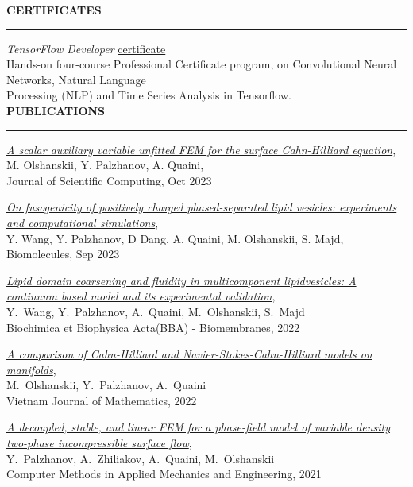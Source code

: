 \documentclass[10pt,letterpaper]{letter}
\newcommand{\gsect}[1]{\textcolor{codepurple}{\textbf{{\Large \uppercase{#1} }}} \\ \hrule}
\begin{document}
\gsect{Certificates}
\textsl{TensorFlow Developer} \href{https://coursera.org/share/f65948fc03c3da5785b670010c27bbe4}{\textsf{certificate}}\\
\hspace*{10mm}  Hands-on four-course Professional Certificate program, on Convolutional Neural Networks, Natural Language \\ \hspace*{10mm} Processing (NLP) and Time Series Analysis in Tensorflow.\\



\newpage
\gsect{Publications}
\begin{etaremune}
	\item \textsl{\href{https://doi.org/10.1007/s10915-023-02370-8}{A scalar auxiliary variable unfitted FEM for the surface Cahn-Hilliard equation}},\\ M. Olshanskii, Y. Palzhanov, A. Quaini,\\
	Journal of Scientific Computing, Oct 2023
	\item \textsl{\href{https://doi.org/10.3390/biom13101473}{On fusogenicity of positively charged phased-separated lipid vesicles: experiments and computational simulations}},\\ Y. Wang, Y. Palzhanov, D Dang, A. Quaini, M. Olshanskii, S. Majd, \\
	Biomolecules, Sep 2023
	\item \textsl{\href{https://doi.org/10.1016/j.bbamem.2022.183898}{Lipid domain coarsening and fluidity in multicomponent lipidvesicles: A continuum based model and its experimental validation}},\\ Y.~Wang, Y.~Palzhanov, A.~Quaini, M.~Olshanskii, S.~Majd\\
	Biochimica et Biophysica Acta(BBA) - Biomembranes, 2022	
	\item \textsl{\href{https://link.springer.com/article/10.1007/s10013-022-00564-5}{A comparison of Cahn-Hilliard and Navier-Stokes-Cahn-Hilliard models on manifolds}},\\ M.~Olshanskii, Y.~Palzhanov, A.~Quaini \\
	Vietnam Journal of Mathematics, 2022	
	\item \textsl{\href{https://www.sciencedirect.com/science/article/abs/pii/S0045782521004989}{A decoupled, stable, and linear FEM for a phase-field model of variable density two-phase incompressible surface flow}},\\ Y.~Palzhanov, A.~Zhiliakov, A.~Quaini, M.~Olshanskii\\
	Computer Methods in Applied Mechanics and Engineering, 2021
\end{etaremune}
\end{document}
